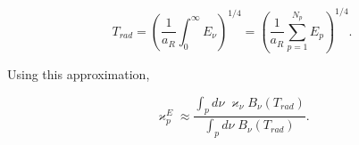 \documentclass{template}
\begin{document}
\begin{equation}
    T_{rad} = \left(\frac{1}{a_R}\int_0 ^\infty E_\nu\right)^{1/4} = \left(\frac{1}{a_R}\sum_{p=1}^{N_p} E_p\right)^{1/4}.
\end{equation}

Using this approximation, 

\begin{equation}
     \varkappa_p^E  \approx \frac{\int_p d\nu \; \varkappa_\nu B_\nu (T_{rad})}{\int_p d\nu \; B_\nu (T_{rad})}.
\end{equation}
\end{document}
